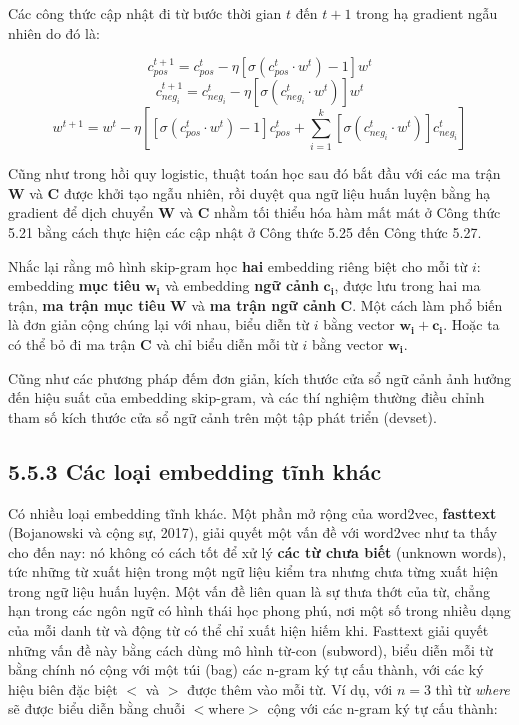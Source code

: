 Các công thức cập nhật đi từ bước thời gian $t$ đến $t+1$ trong hạ gradient ngẫu nhiên do đó là:

\begin{equation}
c_{pos}^{t+1} = c_{pos}^{t} - \eta\left[\sigma(c_{pos}^{t} \cdot w^{t})-1\right]w^{t} \tag{5.25}
\end{equation}
\begin{equation}
c_{neg_i}^{t+1} = c_{neg_i}^{t} - \eta\left[\sigma(c_{neg_i}^{t} \cdot w^{t})\right]w^{t} \tag{5.26}
\end{equation}
\begin{equation}
w^{t+1} = w^{t} - \eta\left[\left[\sigma(c_{pos}^{t} \cdot w^{t})-1\right]c_{pos}^{t} + \sum_{i=1}^{k}\left[\sigma(c_{neg_i}^{t} \cdot w^{t})\right]c_{neg_i}^{t}\right] \tag{5.27}
\end{equation}

Cũng như trong hồi quy logistic, thuật toán học sau đó bắt đầu với các ma trận $\mathbf{W}$ và $\mathbf{C}$ được khởi tạo ngẫu nhiên, rồi duyệt qua ngữ liệu huấn luyện bằng hạ gradient để dịch chuyển $\mathbf{W}$ và $\mathbf{C}$ nhằm tối thiểu hóa hàm mất mát ở Công thức 5.21 bằng cách thực hiện các cập nhật ở Công thức 5.25 đến Công thức 5.27.

Nhắc lại rằng mô hình skip-gram học \textbf{hai} embedding riêng biệt cho mỗi từ $i$: embedding \textbf{mục tiêu} $\mathbf{w_i}$ và embedding \textbf{ngữ cảnh} $\mathbf{c_i}$, được lưu trong hai ma trận, \textbf{ma trận mục tiêu} $\mathbf{W}$ và \textbf{ma trận ngữ cảnh} $\mathbf{C}$. Một cách làm phổ biến là đơn giản cộng chúng lại với nhau, biểu diễn từ $i$ bằng vector $\mathbf{w_i} + \mathbf{c_i}$. Hoặc ta có thể bỏ đi ma trận $\mathbf{C}$ và chỉ biểu diễn mỗi từ $i$ bằng vector $\mathbf{w_i}$.

Cũng như các phương pháp đếm đơn giản, kích thước cửa sổ ngữ cảnh ảnh hưởng đến hiệu suất của embedding skip-gram, và các thí nghiệm thường điều chỉnh tham số kích thước cửa sổ ngữ cảnh trên một tập phát triển (devset).

\subsection*{5.5.3 Các loại embedding tĩnh khác}

Có nhiều loại embedding tĩnh khác. Một phần mở rộng của word2vec, \textbf{fasttext} (Bojanowski và cộng sự, 2017), giải quyết một vấn đề với word2vec như ta thấy cho đến nay: nó không có cách tốt để xử lý \textbf{các từ chưa biết} (unknown words), tức những từ xuất hiện trong một ngữ liệu kiểm tra nhưng chưa từng xuất hiện trong ngữ liệu huấn luyện. Một vấn đề liên quan là sự thưa thớt của từ, chẳng hạn trong các ngôn ngữ có hình thái học phong phú, nơi một số trong nhiều dạng của mỗi danh từ và động từ có thể chỉ xuất hiện hiếm khi. Fasttext giải quyết những vấn đề này bằng cách dùng mô hình từ-con (subword), biểu diễn mỗi từ bằng chính nó cộng với một túi (bag) các n-gram ký tự cấu thành, với các ký hiệu biên đặc biệt $<$ và $>$ được thêm vào mỗi từ. Ví dụ, với $n=3$ thì từ \emph{where} sẽ được biểu diễn bằng chuỗi $<$where$>$ cộng với các n-gram ký tự cấu thành:

